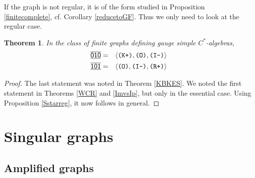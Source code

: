 \documentclass[12pt]{amsbook}%
\newtheorem{theor}{Theorem}[section]
\theoremstyle{defin}
\theoremstyle{remark}
\numberwithin{equation}{chapter}
\numberwithin{theor}{section}
\newcommand{\xyzrel}[1]{\mbox{$\overline{\underline{\mathsf{ #1}}}$}}
\newcommand{\IIIm}{\mbox{\texttt{\textup{(I-)}}}}
\newcommand{\OOO}{\mbox{\texttt{\textup{(O)}}}}
\newcommand{\RRRp}{\mbox{\texttt{\textup{(R+)}}}}
\newcommand{\KKKp}{\mbox{\texttt{\textup{(K+)}}}}
\newcommand{\KKKm}{\mbox{\texttt{\textup{(K-)}}}}
\begin{document}
If the graph is not regular, it is of the form studied in Proposition \ref{finitecomplete}, cf. Corollary  \ref{reducetoGF}. Thus we only need to look at the regular case.

\begin{theor}\label{IOI-cr}
In  the class of finite graphs defining gauge simple $C^*$-algebras,
\begin{eqnarray*}
\xyzrel{010}&=&\langle \KKKp,\OOO,\IIIm\rangle\\
\xyzrel{101}&=&\langle \OOO,\IIIm,\RRRp\rangle\\
\end{eqnarray*}
\end{theor}
\begin{proof}
The last statement was noted in Theorem  \ref{KBKES}. We noted the first statement  in Theorems \ref{WCR} and \ref{ImvsIp}, but only in the essential case. Using Proposition \ref{Sstarreg}, it now follows in general.
\end{proof}





\chapter{Singular graphs}

\section{Amplified graphs}

\statusbar{\elsewhered}{\hered}{\hered}{\hered}{\elsewhered}{\hered}{\hered}{\hered}
\end{document}
